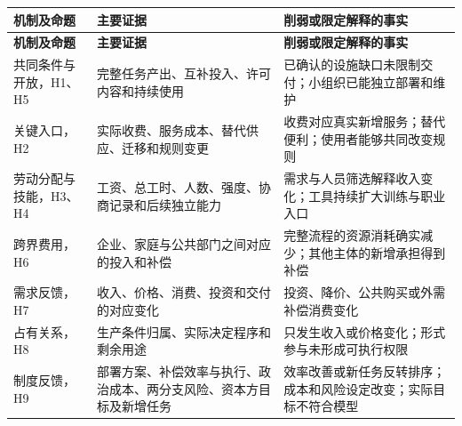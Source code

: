 \documentclass[UTF8,fontset=windows,12pt,a4paper,oneside,openany]{ctexbook}
\begin{document}
\begingroup\footnotesize\setlength{\tabcolsep}{4pt}\renewcommand{\arraystretch}{1.25}
\begin{longtable}{>{\raggedright\arraybackslash}p{}>{\raggedright\arraybackslash}p{}>{\raggedright\arraybackslash}p{}}
\toprule
\textbf{机制及命题} & \textbf{主要证据} & \textbf{削弱或限定解释的事实} \\
\midrule\endfirsthead
\toprule
\textbf{机制及命题} & \textbf{主要证据} & \textbf{削弱或限定解释的事实} \\
\midrule\endhead
\bottomrule\endfoot
共同条件与开放，H1、H5 & 完整任务产出、互补投入、许可内容和持续使用 & 已确认的设施缺口未限制交付；小组织已能独立部署和维护 \\
关键入口，H2 & 实际收费、服务成本、替代供应、迁移和规则变更 & 收费对应真实新增服务；替代便利；使用者能够共同改变规则 \\
劳动分配与技能，H3、H4 & 工资、总工时、人数、强度、协商记录和后续独立能力 & 需求与人员筛选解释收入变化；工具持续扩大训练与职业入口 \\
跨界费用，H6 & 企业、家庭与公共部门之间对应的投入和补偿 & 完整流程的资源消耗确实减少；其他主体的新增承担得到补偿 \\
需求反馈，H7 & 收入、价格、消费、投资和交付的对应变化 & 投资、降价、公共购买或外需补偿消费变化 \\
占有关系，H8 & 生产条件归属、实际决定程序和剩余用途 & 只发生收入或价格变化；形式参与未形成可执行权限 \\
制度反馈，H9 & 部署方案、补偿效率与执行、政治成本、两分支风险、资本方目标及新增任务 & 效率改善或新任务反转排序；成本和风险设定改变；实际目标不符合模型 \\
\end{longtable}\endgroup
\end{document}
